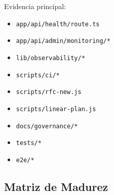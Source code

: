 \documentclass[
  10pt,
  letterpaper,
]{article}
\providecommand{\tightlist}{%
  \setlength{\itemsep}{0pt}\setlength{\parskip}{0pt}}
\let\oldtexttt\texttt
\renewcommand{\texttt}[1]{\oldtexttt{\small #1}}
\begin{document}
Evidencia principal:

\begin{itemize}
\tightlist
\item
  \texttt{app/api/health/route.ts}
\item
  \texttt{app/api/admin/monitoring/*}
\item
  \texttt{lib/observability/*}
\item
  \texttt{scripts/ci/*}
\item
  \texttt{scripts/rfc-new.js}
\item
  \texttt{scripts/linear-plan.js}
\item
  \texttt{docs/governance/*}
\item
  \texttt{tests/*}
\item
  \texttt{e2e/*}
\end{itemize}

\subsection{Matriz de Madurez}\label{matriz-de-madurez}
\end{document}
